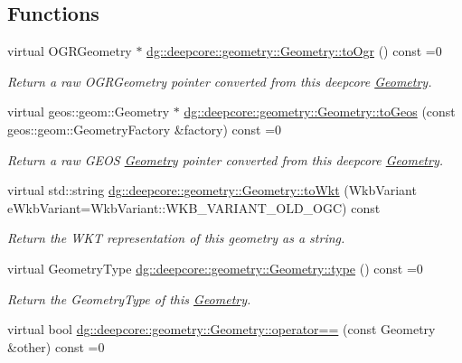 \subsection*{Functions}
\begin{DoxyCompactItemize}
\item 
virtual O\+G\+R\+Geometry $\ast$ \hyperlink{group___geometry_module_ga4ed7d864786c327184cd103ea068ced2}{dg\+::deepcore\+::geometry\+::\+Geometry\+::to\+Ogr} () const =0
\begin{DoxyCompactList}\small\item\em Return a raw O\+G\+R\+Geometry pointer converted from this deepcore \hyperlink{structdg_1_1deepcore_1_1geometry_1_1_geometry}{Geometry}. \end{DoxyCompactList}\item 
virtual geos\+::geom\+::\+Geometry $\ast$ \hyperlink{group___geometry_module_ga9442b08cc58475d6f2f7060cc9cd8a7f}{dg\+::deepcore\+::geometry\+::\+Geometry\+::to\+Geos} (const geos\+::geom\+::\+Geometry\+Factory \&factory) const =0
\begin{DoxyCompactList}\small\item\em Return a raw G\+E\+OS \hyperlink{structdg_1_1deepcore_1_1geometry_1_1_geometry}{Geometry} pointer converted from this deepcore \hyperlink{structdg_1_1deepcore_1_1geometry_1_1_geometry}{Geometry}. \end{DoxyCompactList}\item 
virtual std\+::string \hyperlink{group___geometry_module_gacfdc0f5010d3cf254f9ab5705a5741d9}{dg\+::deepcore\+::geometry\+::\+Geometry\+::to\+Wkt} (Wkb\+Variant e\+Wkb\+Variant=Wkb\+Variant\+::\+W\+K\+B\+\_\+\+V\+A\+R\+I\+A\+N\+T\+\_\+\+O\+L\+D\+\_\+\+O\+GC) const 
\begin{DoxyCompactList}\small\item\em Return the W\+KT representation of this geometry as a string. \end{DoxyCompactList}\item 
virtual Geometry\+Type \hyperlink{group___geometry_module_gacdfc02ad835493ef40a398bdf24e30a1}{dg\+::deepcore\+::geometry\+::\+Geometry\+::type} () const =0
\begin{DoxyCompactList}\small\item\em Return the Geometry\+Type of this \hyperlink{structdg_1_1deepcore_1_1geometry_1_1_geometry}{Geometry}. \end{DoxyCompactList}\item 
virtual bool \hyperlink{group___geometry_module_gaf5b2bf20a71a57cc068e1e3ee78053f8}{dg\+::deepcore\+::geometry\+::\+Geometry\+::operator==} (const Geometry \&other) const =0

\end{DoxyCompactItemize}
